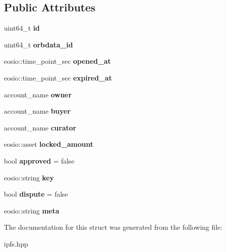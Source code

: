 \subsection*{Public Attributes}
\begin{DoxyCompactItemize}
\item 
\mbox{\label{structeosio_1_1dataorders_a80c9d25554721c5a989a3e9a70b26eba}} 
uint64\+\_\+t {\bfseries id}
\item 
\mbox{\label{structeosio_1_1dataorders_a5588e6d87e40a0bc8455ebf8508e583b}} 
uint64\+\_\+t {\bfseries orbdata\+\_\+id}
\item 
\mbox{\label{structeosio_1_1dataorders_ad5757995b911751346f105fc08aa2e2e}} 
eosio\+::time\+\_\+point\+\_\+sec {\bfseries opened\+\_\+at}
\item 
\mbox{\label{structeosio_1_1dataorders_a0198f555a50fe666eb26020863caee83}} 
eosio\+::time\+\_\+point\+\_\+sec {\bfseries expired\+\_\+at}
\item 
\mbox{\label{structeosio_1_1dataorders_a2e71546d4dadeafd3aabf689180e086a}} 
account\+\_\+name {\bfseries owner}
\item 
\mbox{\label{structeosio_1_1dataorders_a31e6af7c9d65617f5b1cc04c4f47e7ac}} 
account\+\_\+name {\bfseries buyer}
\item 
\mbox{\label{structeosio_1_1dataorders_a17d6276ac95af31fe54bcdb13ed3812e}} 
account\+\_\+name {\bfseries curator}
\item 
\mbox{\label{structeosio_1_1dataorders_aec2a75d9d6502ba4a2bced036cf6a690}} 
eosio\+::asset {\bfseries locked\+\_\+amount}
\item 
\mbox{\label{structeosio_1_1dataorders_ab1096c8ffea778b5882c9986e537239c}} 
bool {\bfseries approved} = false
\item 
\mbox{\label{structeosio_1_1dataorders_a42e596408c49f409c83caa4da5441061}} 
eosio\+::string {\bfseries key}
\item 
\mbox{\label{structeosio_1_1dataorders_ae28791e5cf62311e7e5b2ef0d82b62ef}} 
bool {\bfseries dispute} = false
\item 
\mbox{\label{structeosio_1_1dataorders_a5764fa6399d61bb2fef697b3288eb860}} 
eosio\+::string {\bfseries meta}
\end{DoxyCompactItemize}


The documentation for this struct was generated from the following file\+:\begin{DoxyCompactItemize}
\item 
ipfs.\+hpp\end{DoxyCompactItemize}
